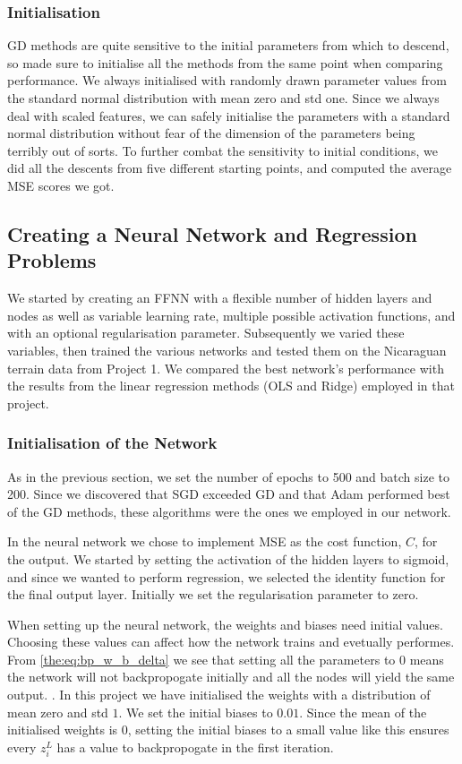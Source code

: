    \subsubsection{Initialisation}
        GD methods are quite sensitive to the initial parameters from which to descend, so made sure to initialise all the methods from the same point when comparing performance. We always initialised with randomly drawn parameter values from the standard normal distribution with mean zero and std one. Since we always deal with scaled features, we can safely initialise the parameters with a standard normal distribution without fear of the dimension of the parameters being terribly out of sorts. To further combat the sensitivity to initial conditions, we did all the descents from five different starting points, and computed the average MSE scores we got.

\subsection{Creating a Neural Network and Regression Problems}
    We started by creating an FFNN with a flexible number of hidden layers and nodes as well as variable learning rate, multiple possible activation functions, and with an optional regularisation parameter. Subsequently we varied these variables, then trained the various networks and tested them on the Nicaraguan terrain data from Project 1. We compared the best network's performance with the results from the linear regression methods (OLS and Ridge) employed in that project. 
    
    \subsubsection{Initialisation of the Network}
        As in the previous section, we set the number of epochs to 500 and batch size to 200. Since we discovered that SGD exceeded GD and that Adam performed best of the GD methods, these algorithms were the ones we employed in our network.    

        In the neural network we chose to implement MSE as the cost function, $C$, for the output. We started by setting the activation of the hidden layers to sigmoid, and since we wanted to perform regression, we selected the identity function for the final output layer. Initially we set the regularisation parameter to zero. 

        When setting up the neural network, the weights and biases need initial values. Choosing these values can affect how the network trains and evetually performes. From \cref{the:eq:bp_w_b_delta} we see that setting all the parameters to $0$ means the network will not backpropogate initially and all the nodes will yield the same output. . In this project we have initialised the weights with a distribution of mean zero and std $1$. We set the initial biases to $0.01$. Since the mean of the initialised weights is 0, setting the initial biases to a small value like this ensures every $z_i^L$ has a value to backpropogate in the first iteration.  
    
